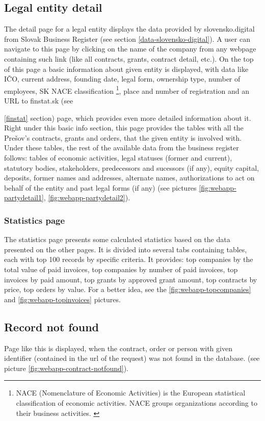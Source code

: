 \documentclass[thesis=B,english]{FITthesis}[2012/06/26]
\begin{document}
\subsection{Legal entity detail}
	The detail page for a legal entity displays the data provided by slovensko.digital from Slovak Business Register (see section \ref{data-slovensko-digital}). A user can navigate to this page by clicking on the name of the company from any webpage containing such link (like all contracts, grants, contract detail, etc.). On the top of this page a basic information about given entity is displayed, with data like IČO, current address, founding date, legal form, ownership type, number of employees, SK NACE classification \footnote{NACE (Nomenclature of Economic Activities) is the European statistical classification of economic activities. NACE groups organizations according to their business activities. \cite{nace}}, place and number of registration and an URL to finstat.sk (see {\ref{finstat} section) page, which provides even more detailed information about it. Right under this basic info section, this page provides the tables with all the Prešov's contracts, grants and orders, that the given entity is involved with. Under these tables, the rest of the available data from the business register follows: tables of economic activities, legal statuses (former and current), statutory bodies, stakeholders,  predecessors and sucessors (if any), equity capital, deposits, former names and addresses, alternate names, authorizations to act on behalf of the entity and past legal forms (if any) (see pictures \ref{fig:webapp-partydetail1}, \ref{fig:webapp-partydetail2}).


\subsubsection{Statistics page}
	The statistics page presents some calculated statistics based on the data presented on the other pages. It is divided into several tabs containing tables, each with top 100 records by specific criteria. It provides: top companies by the total value of paid invoices, top companies by number of paid invoices, top invoices by paid amount, top grants by approved grant amount, top contracts by price, top orders by value. For a better idea, see the \ref{fig:webapp-topcompanies} and \ref{fig:webapp-topinvoices} pictures.

\subsection{Record not found}
	Page like this is displayed, when the contract, order or person with given identifier (contained in the url of the request) was not found in the database. (see picture \ref{fig:webapp-contract-notfound}).
	
}
\end{document}
